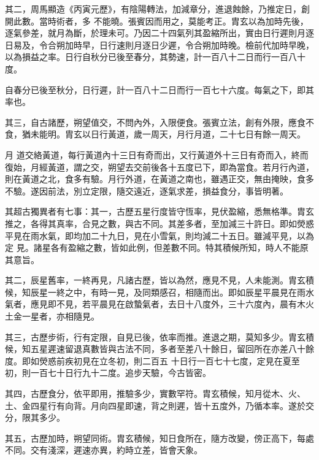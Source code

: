 \begin{pinyinscope}
 其二，周馬顯造《丙寅元歷》，有陰陽轉法，加減章分，進退蝕餘，乃推定日，創開此數。當時術者，多
 不能曉。張賓因而用之，莫能考正。胄玄以為加時先後，逐氣參差，就月為斷，於理未可。乃因二十四氣列其盈縮所出，實由日行遲則月逐日易及，令合朔加時早，日行速則月逐日少遲，令合朔加時晚。檢前代加時早晚，以為損益之率。日行自秋分已後至春分，其勢速，計一百八十二日而行一百八十度。



 自春分已後至秋分，日行遲，計一百八十二日而行一百七十六度。每氣之下，即其率也。



 其三，自古諸歷，朔望值交，不問內外，入限便食。張賓立法，創有外限，應食不食，猶未能明。胄玄以日行黃道，歲一周天，月行月道，二十七日有餘一周天。



 月
 道交絡黃道，每行黃道內十三日有奇而出，又行黃道外十三日有奇而入，終而復始，月經黃道，謂之交，朔望去交前後各十五度已下，即為當食。若月行內道，則在黃道之北，食多有驗。月行外道，在黃道之南也，雖遇正交，無由掩映，食多不驗。遂因前法，別立定限，隨交遠近，逐氣求差，損益食分，事皆明著。



 其超古獨異者有七事：其一，古歷五星行度皆守恆率，見伏盈縮，悉無格準。胄玄推之，各得其真率，合見之數，與古不同。其差多者，至加減三十許日。即如熒惑平見在雨水氣，即均加二十九日，見在小雪氣，則均減二十五日。雖減平見，以為定
 見。諸星各有盈縮之數，皆如此例，但差數不同。特其積候所知，時人不能原其意旨。



 其二，辰星舊率，一終再見，凡諸古歷，皆以為然，應見不見，人未能測。胄玄積候，知辰星一終之中，有時一見，及同類感召，相隨而出。即如辰星平晨見在雨水氣者，應見即不見，若平晨見在啟蟄氣者，去日十八度外，三十六度內，晨有木火土金一星者，亦相隨見。



 其三，古歷步術，行有定限，自見已後，依率而推。進退之期，莫知多少。胄玄積候，知五星遲速留退真數皆與古法不同，多者至差八十餘日，留回所在亦差八十餘度。即如熒惑前疾初見在立冬初，則二百五
 十日行一百七十七度，定見在夏至初，則一百七十日行九十二度。追步天驗，今古皆密。



 其四，古歷食分，依平即用，推驗多少，實數罕符。胄玄積候，知月從木、火、土、金四星行有向背。月向四星即速，背之則遲，皆十五度外，乃循本率。遂於交分，限其多少。



 其五，古歷加時，朔望同術。胄玄積候，知日食所在，隨方改變，傍正高下，每處不同。交有淺深，遲速亦異，約時立差，皆會天象。




\end{pinyinscope}
